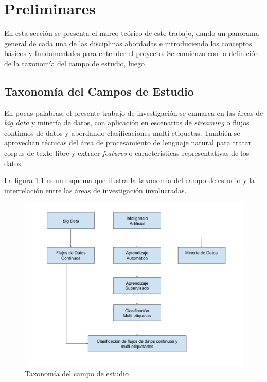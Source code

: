 \chapter{Preliminares}

En esta sección se presenta el marco teórico de este trabajo, dando un panorama
general de cada una de las disciplinas abordadas e introduciendo los conceptos
básicos y fundamentales para entender el proyecto. Se comienza con la definición
de la taxonomía del campo de estudio, luego 

\section{Taxonomía del Campos de Estudio}

En pocas palabras, el presente trabajo de investigación se enmarca en las áreas
de \textit{big data} y minería de datos, con aplicación en escenarios de
\textit{streaming} o flujos continuos de datos y abordando clasificaciones
multi-etiquetas. También se aprovechan técnicas del área de procesamiento de
lenguaje natural para tratar corpus de texto libre y extraer \textit{features} o
características representativas de los datos.

La figura \ref{fig:campo_estudio} es un esquema que ilustra la taxonomía del campo de estudio y la interrelación entre las áreas de investigación involucradas.

\begin{figure}
 \includegraphics[width=\linewidth]{figures/study_field_taxonomy_v2.png}
  \caption{Taxonomía del campo de estudio}
  \label{fig:campo_estudio}
\end{figure}

